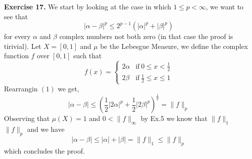 \documentclass{article}
\begin{document}
\pagebreak

\begin{exercise}\textbf{Exercise 17.}
   We start by looking at the case in which $1 \le  p < \infty$, we want to see that
   \begin{equation}
       | \alpha - \beta |^p \le 2^{p-1} \left( |\alpha|^p + |\beta|^p \right) 
   \end{equation}
   for every $\alpha$ and $\beta$ complex numbers not both zero (in that case the proof is tirivial). Let $X = [0,1]$ and $\mu$ be the Lebesgue Measure, we define the complex function $f$ over $[0,1]$ such that
   \[
       f \left( x \right) =  
       \begin{cases}
           2\alpha & \text{if}\  0 \le x < \frac{1}{2} \\
           2\beta & \text{if}\  \frac{1}{2} \le x \le 1
       \end{cases}
   \]
   Rearrangin $ \left( 1 \right) $ we get,
   \begin{equation}
       |\alpha - \beta| \le \left( \frac{1}{2} | 2\alpha |^p + \frac{1}{2} | 2\beta | ^p \right) ^{\frac{1}{p}} = \|f\|_p 
   \end{equation}
   Observing that $\mu \left( X \right) = 1$ and $0 < \|f\|_\infty $ by Ex.5 we know that $\|f\|_1 $ \le $\|f\|_p $ and we have
   \begin{equation}
       |\alpha - \beta| \le |\alpha| + |\beta| = \|f\|_1 \le \|f\|_p 
   \end{equation}
   which concludes the proof. 


\end{exercise}

\bigbreak
\end{document}
